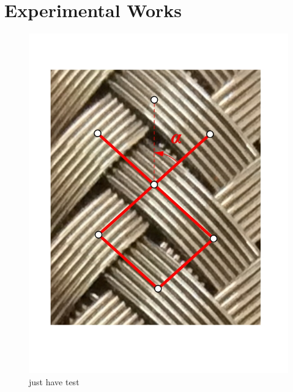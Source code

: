 

\section{Experimental Works}
\label{experiment}








\begin{figure}
\centering
\includegraphics[width=0.7\linewidth]{figures/braid-angle}
\caption{ just have test}
\label{fig:braid-angle}
\end{figure}
